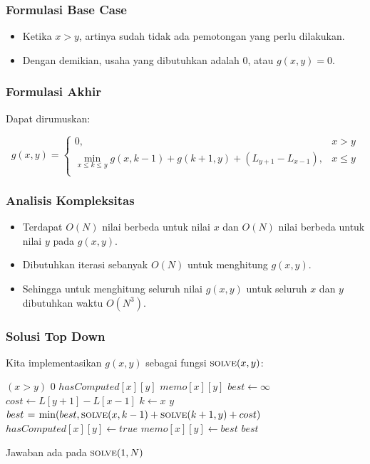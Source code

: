 \begin{frame} 
\frametitle{Formulasi Base Case}
\begin{itemize}
  \item Ketika $x>y$, artinya sudah tidak ada pemotongan yang perlu dilakukan.
  \item Dengan demikian, usaha yang dibutuhkan adalah 0, atau $g(x,y) = 0$.
\end{itemize}
\end{frame}

\begin{frame} 
\frametitle{Formulasi Akhir}
Dapat dirumuskan:
\begin{small}
\[g(x,y) = \left\{\begin{array}{lr}
    0, & x>y\\
    \min_{x \leq k \leq y} g(x,k-1) + g(k+1,y) + (L_{y+1} - L_{x-1}), & x \leq y \\
    \end{array}\right.\]
\end{small}
\end{frame}

\begin{frame} 
\frametitle{Analisis Kompleksitas}
\begin{itemize}
  \item Terdapat $O(N)$ nilai berbeda untuk nilai $x$ dan $O(N)$ nilai berbeda untuk nilai $y$ pada $g(x,y)$.
  \item Dibutuhkan iterasi sebanyak $O(N)$ untuk menghitung $g(x,y)$. 
  \item Sehingga untuk menghitung seluruh nilai $g(x,y)$ untuk seluruh $x$ dan $y$ dibutuhkan waktu $O(N^3)$.
\end{itemize}
\end{frame}

\begin{frame}
\frametitle{Solusi Top Down}
Kita implementasikan $g(x, y)$ sebagai fungsi $\textnormal{\scshape solve}(x,y)$:
\begin{small}
\begin{codebox}
\li \If $(x > y)$ \Then
\li   \Return $0$
\li \ElseIf $hasComputed[x][y]$ \Then
\li   \Return $memo[x][y]$ 
\li \Else
\li   $best \gets \infty$
\li   $cost \gets L[y+1] - L[x-1]$
\li   \For $k \gets x$ \To $y$ \Do
\li     $best \mathrel{\hspace{1pt}=\hspace{1pt}} \min(best, \textnormal{\scshape solve}(x,k-1) + \textnormal{\scshape solve}(k+1, y) + cost)$
      \End  
\li   $hasComputed[x][y] \gets true$
\li   $memo[x][y] \gets best$
\li   \Return $best$
    \End
\end{codebox}
\end{small}
Jawaban ada pada $\textnormal{\scshape solve}(1, N)$
\end{frame}


